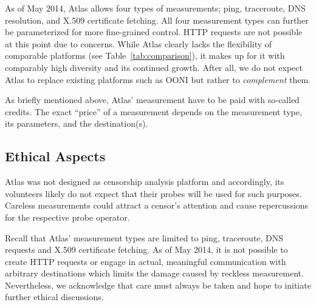 As of May 2014, Atlas allows four types of measurements; ping, traceroute, DNS
resolution, and X.509 certificate fetching.  All four measurement types can
further be parameterized for more fine-grained control.  HTTP requests are not
possible at this point due to concerns.  While Atlas clearly lacks the
flexibility of comparable platforms (see Table~\ref{tab:comparison}), it makes
up for it with comparably high diversity and its continued growth.  After all,
we do not expect Atlas to replace existing platforms such as OONI but rather to
\emph{complement} them.


As briefly mentioned above, Atlas' measurement have to be paid with so-called
credits.  The exact ``price'' of a measurement depends on the measurement type,
its parameters, and the destination(s).

\subsection{Ethical Aspects}
Atlas was not designed as censorship analysis platform and accordingly, its
volunteers likely do not expect that their probes will be used for such
purposes.  Careless measurements could attract a censor's attention and cause
repercussions for the respective probe operator.

Recall that Atlas' measurement types are limited to ping, traceroute, DNS
requests and X.509 certificate fetching.  As of May 2014, it is not possible to
create HTTP requests or engage in actual, meaningful communication with
arbitrary destinations which limits the damage caused by reckless measurement.
Nevertheless, we acknowledge that care must always be taken and hope to initiate
further ethical discussions.

